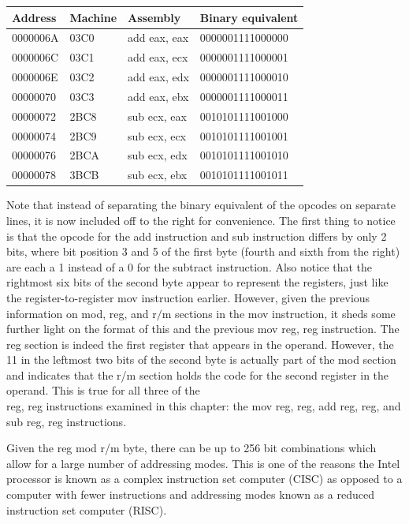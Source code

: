 \documentclass[10pt]{article}
\begin{document}
\begin{center}
\begin{tabular}{|l|l|l|l|}
\hline
Address & Machine & Assembly & Binary equivalent \\
\hline
0000006A & 03C0 & add eax, eax & 0000001111000000 \\
\hline
0000006C & 03C1 & add eax, ecx & 0000001111000001 \\
\hline
0000006E & 03C2 & add eax, edx & 0000001111000010 \\
\hline
00000070 & 03C3 & add eax, ebx & 0000001111000011 \\
\hline
00000072 & 2BC8 & sub ecx, eax & 0010101111001000 \\
\hline
00000074 & 2BC9 & sub ecx, ecx & 0010101111001001 \\
\hline
00000076 & 2BCA & sub ecx, edx & 0010101111001010 \\
\hline
00000078 & 3BCB & sub ecx, ebx & 0010101111001011 \\
\hline
\end{tabular}
\end{center}

Note that instead of separating the binary equivalent of the opcodes on separate lines, it is now included off to the right for convenience. The first thing to notice is that the opcode for the add instruction and sub instruction differs by only 2 bits, where bit position 3 and 5 of the first byte (fourth and sixth from the right) are each a 1 instead of a 0 for the subtract instruction. Also notice that the rightmost six bits of the second byte appear to represent the registers, just like the register-to-register mov instruction earlier. However, given the previous information on mod, reg, and $\mathrm{r} / \mathrm{m}$ sections in the mov instruction, it sheds some further light on the format of this and the previous mov reg, reg instruction. The reg section is indeed the first register that appears in the operand. However, the 11 in the leftmost two bits of the second byte is actually part of the mod section and indicates that the r/m section holds the code for the second register in the operand. This is true for all three of the\\
reg, reg instructions examined in this chapter: the mov reg, reg, add reg, reg, and sub reg, reg instructions.

Given the reg mod r/m byte, there can be up to 256 bit combinations which allow for a large number of addressing modes. This is one of the reasons the Intel processor is known as a complex instruction set computer (CISC) as opposed to a computer with fewer instructions and addressing modes known as a reduced instruction set computer (RISC).
\end{document}
